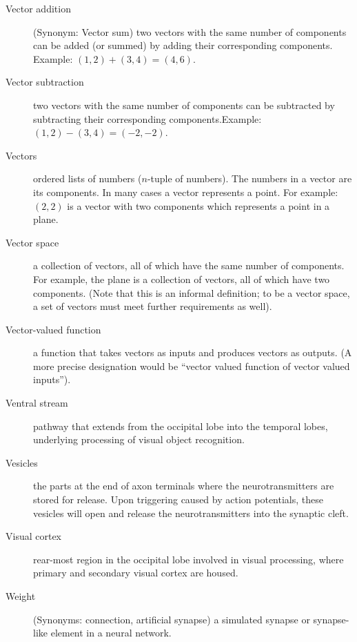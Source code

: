 \begin{description}
\item[Vector addition] (Synonym: Vector sum) two vectors with the same number of components can be added (or summed) by adding their corresponding components. Example: $(1,2) + (3,4) = (4,6)$.

\item[Vector subtraction] two vectors with the same number of components can be subtracted by subtracting their corresponding components.Example: $(1,2) - (3,4) = (-2,-2)$.

\item[Vectors] ordered lists of numbers ($n$-tuple of numbers). The numbers in a vector are its components. In many cases a vector represents a point. For example: $(2,2)$ is a vector with two components which represents a point in a plane.

\item[Vector space] a collection of vectors, all of which have the same number of components. For example, the plane is a collection of vectors, all of which have two components. (Note that this is an  informal definition; to be a vector space, a set of vectors must meet further requirements as well).

\item[Vector-valued function] a function that takes vectors as inputs and produces vectors as outputs. (A more precise designation would be ``vector valued function of vector valued inputs''). 

\item[Ventral stream] pathway that extends from the occipital lobe into the temporal lobes, underlying processing of visual object recognition. 

\item[Vesicles] the parts at the end of axon terminals where the neurotransmitters are stored for release. Upon triggering caused by action potentials, these vesicles will open and release the neurotransmitters into the synaptic cleft.

\item[Visual cortex] rear-most region in the occipital lobe involved in visual processing, where primary and secondary visual cortex are housed.

\item[Weight] (Synonyms: connection, artificial synapse) a simulated synapse or synapse-like element in a neural network. 



\end{description}
